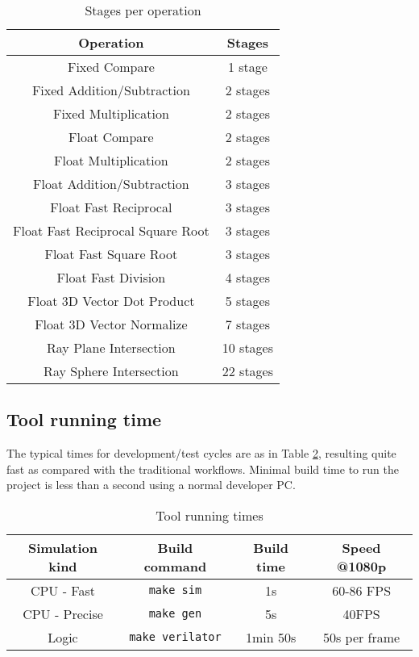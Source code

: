 \documentclass[conference]{IEEEtran}
\begin{document}
\begin{table}
\caption{Stages per operation}
\begin{center}
\begin{tabular}{|c|c|}
\hline \textbf{Operation}&  \textbf{Stages} \\
\hline Fixed Compare & 1 stage \\
\hline Fixed Addition/Subtraction & 2 stages \\
\hline Fixed Multiplication & 2 stages \\
\hline Float Compare & 2 stages \\
\hline Float Multiplication & 2 stages \\
\hline Float Addition/Subtraction & 3 stages \\
\hline Float Fast Reciprocal & 3 stages \\
\hline Float Fast Reciprocal Square Root & 3 stages \\
\hline Float Fast Square Root & 3 stages \\
\hline Float Fast Division & 4 stages \\
\hline Float 3D Vector Dot Product & 5 stages \\
\hline Float 3D Vector Normalize & 7 stages \\
\hline Ray Plane Intersection & 10 stages \\
\hline Ray Sphere Intersection & 22 stages \\
\hline
\end{tabular}
\label{tabopstages}
\end{center}
\end{table}


\subsection{Tool running time}

The typical times for development/test cycles are as in Table \ref{tabtimings}, resulting quite fast as compared with the traditional workflows. Minimal build time to run the project is less than a second using a normal developer PC.

\begin{table}
\caption{Tool running times}
\begin{center}
\begin{tabular}{|c|c|c|c|}
\hline \textbf{Simulation kind} & \textbf{Build command}&  \textbf{Build time}& \textbf{Speed @1080p} \\
\hline CPU - Fast & \texttt{make sim} & 1s & 60-86 FPS \\
\hline CPU - Precise & \texttt{make gen} & 5s & 40FPS \\
\hline Logic & \texttt{make verilator} & 1min 50s & 50s per frame \\
\hline
\end{tabular}
\label{tabtimings}
\end{center}
\end{table}
\end{document}
